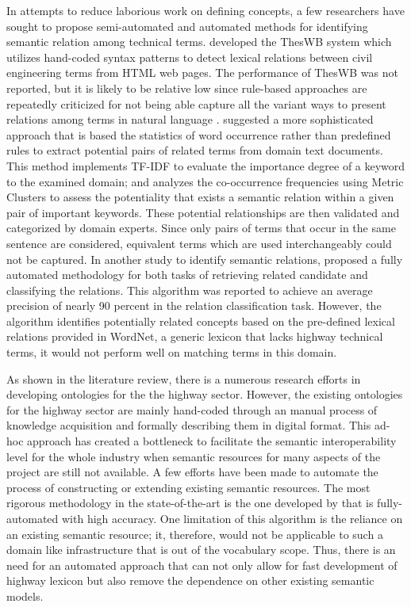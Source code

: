 \documentclass[Journal,InsideFigs, DoubleSpace]{ascelike} %
\begin{document}
In attempts to reduce laborious work on defining concepts, a few researchers have sought to propose semi-automated and automated methods for identifying semantic relation among technical terms.  developed the ThesWB system which utilizes hand-coded syntax patterns to detect lexical relations between civil engineering terms from HTML web pages. The performance of ThesWB was not reported, but it is likely to be relative low since rule-based approaches are repeatedly criticized for not being able capture all the variant ways to present relations among terms in natural language \cite{Marcus95,navigli10}.  suggested a more sophisticated approach that is based the statistics of word occurrence rather than predefined rules to extract potential pairs of related terms from domain text documents. This method implements TF-IDF to evaluate the importance degree of a keyword to the examined domain; and analyzes the co-occurrence frequencies using Metric Clusters to assess the potentiality that exists a semantic relation within a given pair of important keywords. These potential relationships are then validated and categorized by domain experts. Since only pairs of terms that occur in the same sentence are considered, equivalent terms which are used interchangeably could not be captured. In another study to identify semantic relations,  proposed a fully automated methodology for both tasks of retrieving related candidate and classifying the relations. This algorithm was reported to achieve an average precision of nearly 90 percent in the relation classification task. However, the algorithm identifies potentially related concepts based on the pre-defined lexical relations provided in WordNet, a generic lexicon that lacks highway technical terms, it would not perform well on matching terms in this domain.
\par
As shown in the literature review, there is a numerous research efforts in developing ontologies for the the highway sector. However, the existing ontologies for the highway sector are mainly hand-coded through an manual process of knowledge acquisition and formally describing them in digital format. This ad-hoc approach has created a bottleneck to facilitate the semantic interoperability level for the whole industry when semantic resources for many aspects of the project are still not available. A few efforts have been made to automate the process of constructing or extending existing semantic resources. The most rigorous methodology in the state-of-the-art is the one developed by  that is fully-automated with high accuracy. One limitation of this algorithm is the reliance on an existing semantic resource; it, therefore, would not be applicable to such a domain like infrastructure that is out of the vocabulary scope. Thus, there is an need for an automated approach that can not only allow for fast development of highway lexicon but also remove the dependence on other existing semantic models. 
\end{document}

